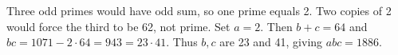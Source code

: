 Three odd primes would have odd sum, so one prime equals 2. Two copies of 2 would force the third to be 62, not prime. Set $a=2$. Then $b+c=64$ and $bc=1071-2\cdot64=943=23\cdot41$. Thus $b,c$ are 23 and 41, giving $abc=\boxed{1886}$.
